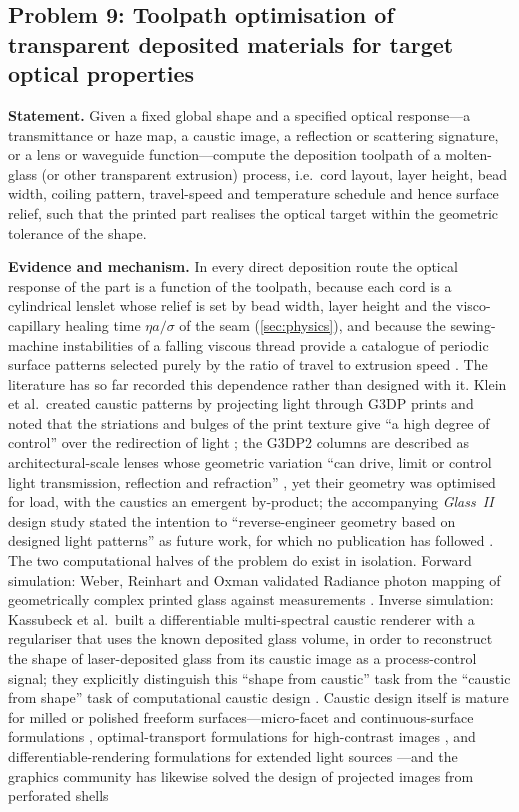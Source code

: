 \subsection{Problem 9: Toolpath optimisation of transparent deposited materials for target optical properties}
\label{sec:open:toolpath}
\textbf{Statement.} Given a fixed global shape and a specified optical response---a transmittance or haze map, a caustic image, a reflection or scattering signature, or a lens or waveguide function---compute the deposition toolpath of a molten-glass (or other transparent extrusion) process, i.e.\ cord layout, layer height, bead width, coiling pattern, travel-speed and temperature schedule and hence surface relief, such that the printed part realises the optical target within the geometric tolerance of the shape.

\textbf{Evidence and mechanism.} In every direct deposition route the optical response of the part is a function of the toolpath, because each cord is a cylindrical lenslet whose relief is set by bead width, layer height and the visco-capillary healing time \(\eta a/\sigma\) of the seam (\cref{sec:physics}), and because the sewing-machine instabilities of a falling viscous thread provide a catalogue of periodic surface patterns selected purely by the ratio of travel to extrusion speed \citep{brun2017}. The literature has so far recorded this dependence rather than designed with it. Klein et al.\ created caustic patterns by projecting light through G3DP prints and noted that the striations and bulges of the print texture give ``a high degree of control'' over the redirection of light \citep{klein2015,klein2015thesis}; the G3DP2 columns are described as architectural-scale lenses whose geometric variation ``can drive, limit or control light transmission, reflection and refraction'' \citep{inamura2018}, yet their geometry was optimised for load, with the caustics an emergent by-product; the accompanying \emph{Glass~II} design study stated the intention to ``reverse-engineer geometry based on designed light patterns'' as future work, for which no publication has followed \citep{inglessis2017glass2}. The two computational halves of the problem do exist in isolation. Forward simulation: Weber, Reinhart and Oxman validated Radiance photon mapping of geometrically complex printed glass against measurements \citep{weber2020photon}. Inverse simulation: Kassubeck et al.\ built a differentiable multi-spectral caustic renderer with a regulariser that uses the known deposited glass volume, in order to reconstruct the shape of laser-deposited glass from its caustic image as a process-control signal; they explicitly distinguish this ``shape from caustic'' task from the ``caustic from shape'' task of computational caustic design \citep{kassubeck2021caustics}. Caustic design itself is mature for milled or polished freeform surfaces---micro-facet and continuous-surface formulations \citep{papas2011caustics,kiser2013caustics,yue2014caustics}, optimal-transport formulations for high-contrast images \citep{schwartzburg2014caustics}, and differentiable-rendering formulations for extended light sources \citep{zhou2025caustics}---and the graphics community has likewise solved the design of projected images from perforated shells 